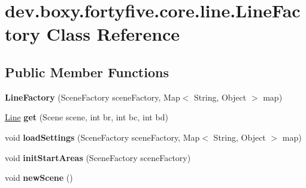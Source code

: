 \hypertarget{classdev_1_1boxy_1_1fortyfive_1_1core_1_1line_1_1_line_factory}{
\section{dev.boxy.fortyfive.core.line.LineFactory Class Reference}
\label{d0/db4/classdev_1_1boxy_1_1fortyfive_1_1core_1_1line_1_1_line_factory}
}
\subsection*{Public Member Functions}
\begin{DoxyCompactItemize}
\item 
\hypertarget{classdev_1_1boxy_1_1fortyfive_1_1core_1_1line_1_1_line_factory_ab49df942cf632e71e34b42731edd4580}{
{\bfseries LineFactory} (SceneFactory sceneFactory, Map$<$ String, Object $>$ map)}
\label{d0/db4/classdev_1_1boxy_1_1fortyfive_1_1core_1_1line_1_1_line_factory_ab49df942cf632e71e34b42731edd4580}

\item 
\hypertarget{classdev_1_1boxy_1_1fortyfive_1_1core_1_1line_1_1_line_factory_a0e02ac7b93c6ca8d7f91b4512f03168d}{
\hyperlink{classdev_1_1boxy_1_1fortyfive_1_1core_1_1line_1_1_line}{Line} {\bfseries get} (Scene scene, int br, int bc, int bd)}
\label{d0/db4/classdev_1_1boxy_1_1fortyfive_1_1core_1_1line_1_1_line_factory_a0e02ac7b93c6ca8d7f91b4512f03168d}

\item 
\hypertarget{classdev_1_1boxy_1_1fortyfive_1_1core_1_1line_1_1_line_factory_a63140377f13198974aea6a4b65086b7e}{
void {\bfseries loadSettings} (SceneFactory sceneFactory, Map$<$ String, Object $>$ map)}
\label{d0/db4/classdev_1_1boxy_1_1fortyfive_1_1core_1_1line_1_1_line_factory_a63140377f13198974aea6a4b65086b7e}

\item 
\hypertarget{classdev_1_1boxy_1_1fortyfive_1_1core_1_1line_1_1_line_factory_a5c088924ecbbda1f06f0856d076e01dd}{
void {\bfseries initStartAreas} (SceneFactory sceneFactory)}
\label{d0/db4/classdev_1_1boxy_1_1fortyfive_1_1core_1_1line_1_1_line_factory_a5c088924ecbbda1f06f0856d076e01dd}

\item 
\hypertarget{classdev_1_1boxy_1_1fortyfive_1_1core_1_1line_1_1_line_factory_a204ffccc835f63d570d664868a0f09ee}{
void {\bfseries newScene} ()}
\label{d0/db4/classdev_1_1boxy_1_1fortyfive_1_1core_1_1line_1_1_line_factory_a204ffccc835f63d570d664868a0f09ee}


\end{DoxyCompactItemize}
